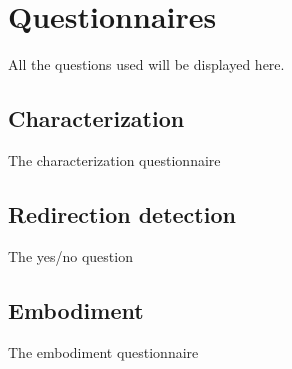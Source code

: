 
\chapter{Questionnaires} %

\label{AppendixA} %

All the questions used will be displayed here.

\section{Characterization}

The characterization questionnaire

\section{Redirection detection}

The yes/no question

\section{Embodiment}

The embodiment questionnaire
